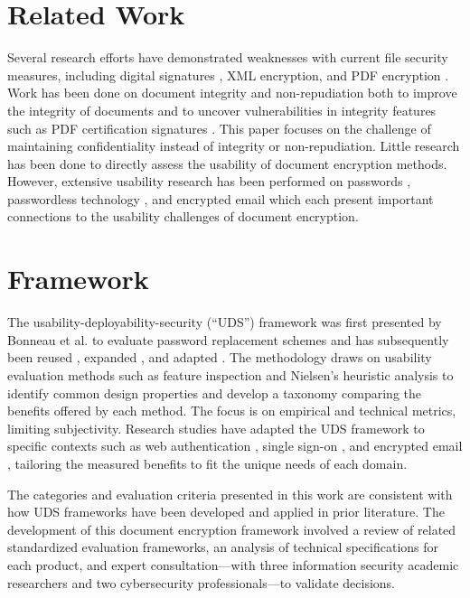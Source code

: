 \documentclass[sigconf]{acmart}
\begin{document}
\section{Related Work}
Several research efforts have demonstrated weaknesses with current file security measures, including digital signatures \cite{rohlmann_breaking_2021}, XML
encryption, and PDF encryption \cite{muller_practical_2019}. Work has been done on document integrity and non-repudiation both to improve the integrity of documents \cite{shatnawi_maintaining_2017} and to uncover vulnerabilities in integrity features such as PDF certification signatures \cite{rohlmann_breaking_2021}. This paper focuses on the challenge of maintaining confidentiality instead of integrity or non-repudiation. Little research has been done to directly assess the usability of document encryption methods. However, extensive usability research has been performed on passwords \cite{bonneau_quest_2012, zimmermann_quest_2018}, passwordless technology \cite{alaca_comparative_2021-1}, and encrypted email \cite{borisov_sok_2021} which each present important connections to the usability challenges of document encryption.



\section{Framework}
The usability-deployability-security (“UDS”) framework was first presented by Bonneau et al. \cite{bonneau_quest_2012} to evaluate password replacement schemes and has subsequently been reused \cite{alaca_comparative_2021-1, alaca_comparative_2021}, expanded \cite{zimmermann_quest_2018}, and adapted \cite{borisov_sok_2021}. The methodology draws on usability evaluation methods such as feature inspection and Nielsen’s heuristic analysis to identify common design properties and develop a taxonomy comparing the benefits offered by each method. The
focus is on empirical and technical metrics, limiting subjectivity. Research studies have adapted the UDS framework to specific contexts such as web authentication \cite{alaca_comparative_2021-1}, single sign-on \cite{alaca_comparative_2021}, and encrypted email \cite{borisov_sok_2021}, tailoring the measured benefits to fit the unique needs of each domain.

The categories and evaluation criteria presented in this work are consistent with how UDS frameworks have been developed and applied in prior literature. The development of this document encryption framework involved a review of related standardized evaluation frameworks, an analysis of technical specifications for each product, and expert consultation—with three information security academic researchers and two cybersecurity professionals—to validate decisions.
\end{document}
